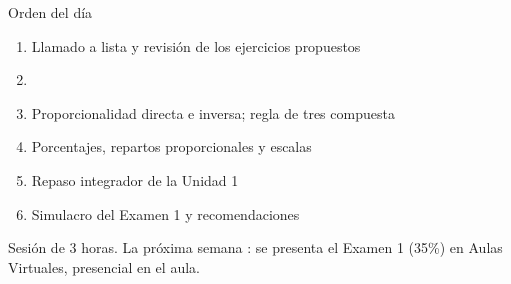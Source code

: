 \documentclass[aspectratio=169,10pt]{beamer}
\begin{document}
\portada

\begin{frame}{Orden del día}
  \begin{enumerate}
    \item Llamado a lista y revisión de los ejercicios propuestos
    \item {}
    \item Proporcionalidad directa e inversa; regla de tres compuesta
    \item Porcentajes, repartos proporcionales y escalas
    \item Repaso integrador de la Unidad 1
    \item Simulacro del Examen 1 y recomendaciones
  \end{enumerate}

  \vspace{0.25cm}
  {\footnotesize\color{uniGris} Sesión de 3 horas. La próxima semana
  : se presenta el Examen 1 (35\%) en Aulas
  Virtuales, presencial en el aula.}
\end{frame}

\end{document}
